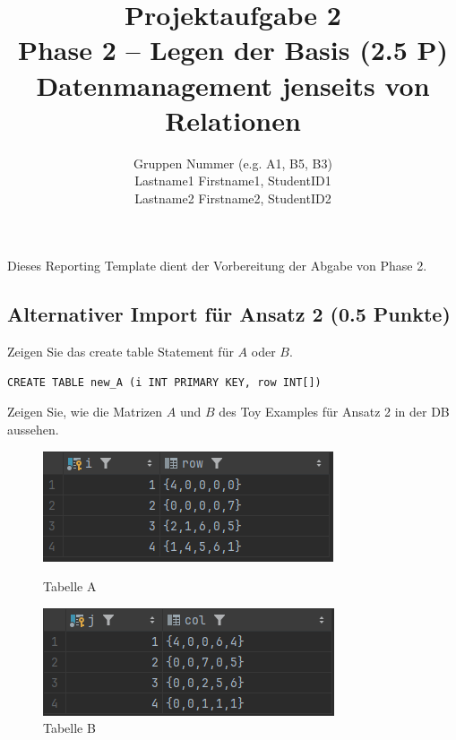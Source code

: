 \documentclass[11pt]{scrartcl}
\title{
  \textbf{\large Projektaufgabe 2 } \\
  Phase 2 – Legen der Basis (2.5 P) \\
  {\large Datenmanagement jenseits von Relationen}
}
\author{
  Gruppen Nummer (e.g. A1, B5, B3) \\
  \large Lastname1 Firstname1, StudentID1 \\
  \large Lastname2 Firstname2, StudentID2 
}
\begin{document}
\maketitle\thispagestyle{empty}

Dieses Reporting Template dient der Vorbereitung der Abgabe von Phase 2.

\subsection*{Alternativer Import für Ansatz 2 (0.5 Punkte)}

Zeigen Sie das create table Statement für $A$ oder $B$. 

\begin{lstlisting}[style=dmrsql]
  CREATE TABLE new_A (i INT PRIMARY KEY, row INT[])
\end{lstlisting}

Zeigen Sie, wie die Matrizen $A$ und $B$ des Toy Examples für Ansatz 2 in der DB aussehen.

\begin{figure}[H]
  \begin{minipage}[b]{.4\linewidth}
    \begin{center}
      \includegraphics[width=\linewidth]{Tabelle_new_A.png}
      \caption{Tabelle A}
    \end{center}
  \end{minipage}
  \hspace{.1\linewidth}
  \begin{minipage}[b]{.4\linewidth}
    \begin{center}
      \includegraphics[width=\linewidth]{Tabelle_new_B.png}
      \caption{Tabelle B}
    \end{center}
  \end{minipage}
\end{figure}
\end{document}
